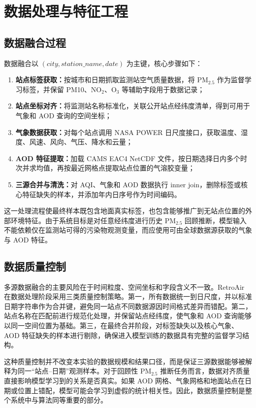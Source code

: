 \documentclass[UTF8,zihao=-4,a4paper]{ctexart}
\newcommand{\pmfine}{PM$_{2.5}$}
\newcommand{\aod}{AOD}
\begin{document}
\section{数据处理与特征工程}

\subsection{数据融合过程}

数据融合以 $(city, station\_name, date)$ 为主键，核心步骤如下：

\begin{enumerate}
  \item \textbf{站点标签获取：}按城市和日期抓取监测站空气质量数据，将 \pmfine{} 作为监督学习标签，并保留 PM10、NO$_2$、O$_3$ 等辅助字段用于数据记录；
  \item \textbf{站点坐标对齐：}将监测站名称标准化，关联公开站点经纬度清单，得到可用于气象和 \aod{} 查询的空间坐标；
  \item \textbf{气象数据获取：}对每个站点调用 NASA POWER 日尺度接口，获取温度、湿度、风速、风向、气压、降水和云量；
  \item \textbf{\aod{} 特征提取：}加载 CAMS EAC4 NetCDF 文件，按日期选择日内多个时次并求均值，再按最近网格点提取站点位置的气溶胶变量；
  \item \textbf{三源合并与清洗：}对 AQI、气象和 \aod{} 数据执行 inner join，删除标签或核心特征缺失的样本，并添加年内日序号作为时间编码。
\end{enumerate}

这一处理流程使最终样本既包含地面真实标签，也包含能够推广到无站点位置的外部环境特征。由于系统目标是对任意经纬度进行历史 \pmfine{} 回顾推断，模型输入不能依赖仅在监测站可得的污染物观测变量，而应使用可由全球数据源获取的气象与 \aod{} 特征。

\subsection{数据质量控制}

多源数据融合的主要风险在于时间粒度、空间坐标和字段含义不一致。RetroAir 在数据处理阶段采用三类质量控制策略。第一，所有数据统一到日尺度，并以标准日期字符串作为合并键，避免同一站点不同数据源因时间格式差异而错配。第二，站点名称在匹配前进行规范化处理，并保留站点经纬度，使气象和 \aod{} 查询能够以同一空间位置为基础。第三，在最终合并阶段，对标签缺失以及核心气象、\aod{} 特征缺失的样本进行剔除，确保进入模型训练的数据具有完整的监督学习结构。

这种质量控制并不改变本实验的数据规模和结果口径，而是保证三源数据能够被解释为同一“站点--日期”观测样本。对于回顾性 \pmfine{} 推断任务而言，数据对齐质量直接影响模型学习到的关系是否真实。如果 \aod{} 网格、气象网格和地面站点在日期或位置上错配，模型可能会学习到虚假的统计相关性。因此，数据质量控制是整个系统中与算法同等重要的部分。
\end{document}

